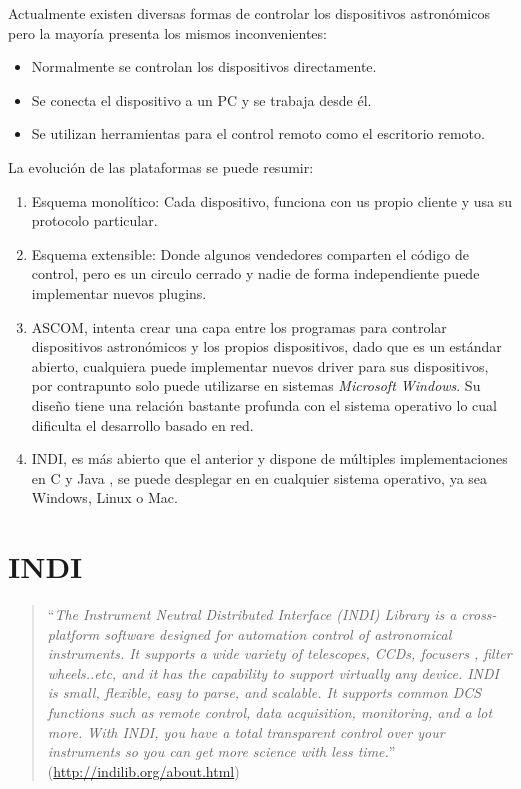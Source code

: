 Actualmente existen diversas formas de controlar los dispositivos astronómicos pero la mayoría presenta los mismos inconvenientes:

\begin{itemize}
	\item Normalmente se controlan los dispositivos directamente.
	\item Se conecta el dispositivo a un PC y se trabaja desde él.
	\item Se utilizan herramientas para el control remoto como el escritorio remoto.
\end{itemize}

\newpage

La evolución de las plataformas se puede resumir:

\begin{enumerate}
\item Esquema monolítico:  Cada dispositivo, funciona con us propio cliente y usa su protocolo particular.

\item Esquema extensible: Donde algunos vendedores comparten el código de control, pero es un circulo cerrado y nadie de forma independiente puede implementar nuevos plugins.

\item ASCOM, intenta crear una capa entre los programas para controlar dispositivos astronómicos y los propios dispositivos, dado que es un estándar abierto, cualquiera puede implementar nuevos driver para sus dispositivos, por contrapunto solo puede utilizarse en sistemas \textit{Microsoft Windows}. Su diseño tiene una relación bastante profunda con el sistema operativo lo cual dificulta el desarrollo basado en red.

\item INDI, es más abierto que el anterior y dispone de múltiples implementaciones en C y  Java \cite{indiforjava}, se puede desplegar en en cualquier sistema operativo, ya sea Windows, Linux o Mac.

\end{enumerate}

\section{INDI}

\begin{quote}``\textit{The Instrument Neutral Distributed Interface (INDI) Library is a cross-platform software designed for automation  control of astronomical instruments. It supports a wide variety of telescopes, CCDs, focusers , filter wheels..etc, and it has the capability to support virtually any device. INDI is small, flexible, easy to parse, and scalable. It supports common DCS functions such as remote control, data acquisition, monitoring, and a lot more. With INDI, you have a total transparent control over your instruments so you can get more science with less time.}''
	\newline(\href{http://indilib.org/about.html}{http://indilib.org/about.html})
\end{quote}

